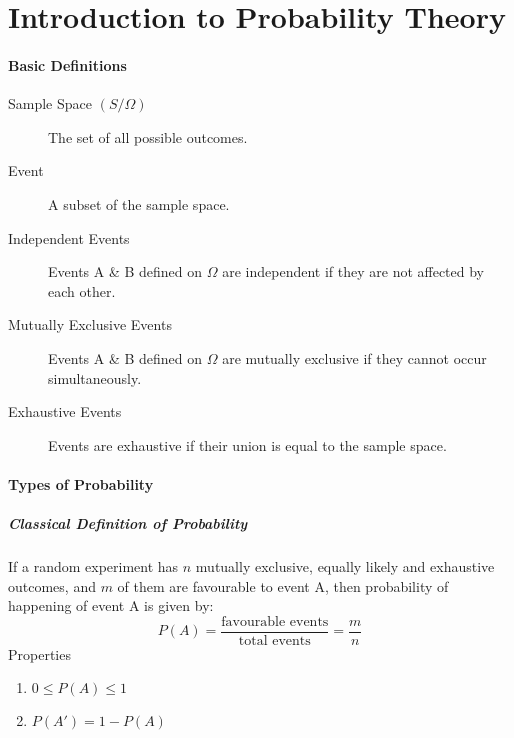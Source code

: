 \documentclass[
10pt, %
a4paper, %
]{report}
\begin{document}
\pagestyle{myheadings} %



\thispagestyle{plain} %

\printtitle %


\part{Introduction to Probability Theory}

\subsection*{Basic Definitions}
\begin{description}
\item[Sample Space \((S/\Omega)\)] The set of all possible outcomes.
\item[Event] A subset of the sample space.
\item[Independent Events] Events A \& B defined on \(\Omega\) are independent if they are not affected  by each other.
\item[Mutually Exclusive Events] Events A \& B defined on \(\Omega\) are mutually exclusive if they cannot occur simultaneously.
\item[Exhaustive Events] Events are exhaustive if their union is equal to the sample space.
\end{description}



\subsection*{Types of Probability}
\subsubsection*{Classical Definition of Probability}
    If a random experiment has \(n\) mutually exclusive, equally likely and exhaustive outcomes, and \(m\) of them are favourable to event A, then probability of happening of event A is given by:
    \[
    P(A)=\frac{\text{favourable events}}{\text{total events}}=\frac{m}{n}
    \]
Properties
\begin{enumerate}
\item \(0\leq P(A) \leq 1\)
\item \(P(A')=1-P(A)\)
\end{enumerate}
\end{document}
